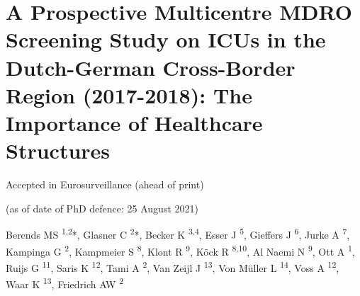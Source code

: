 \documentclass[
]{book}
\begin{document}
\hypertarget{ch10-multi-mdro-screening}{%
\chapter{A Prospective Multicentre MDRO Screening Study on ICUs in the Dutch-German Cross-Border Region (2017-2018): The Importance of Healthcare Structures}\label{ch10-multi-mdro-screening}}

Accepted in Eurosurveillance (ahead of print)

(as of date of PhD defence: 25 August 2021)

Berends MS \textsuperscript{1,2}*, Glasner C \textsuperscript{2}*, Becker K \textsuperscript{3,4}, Esser J \textsuperscript{5}, Gieffers J \textsuperscript{6}, Jurke A \textsuperscript{7}, Kampinga G \textsuperscript{2}, Kampmeier S \textsuperscript{8}, Klont R \textsuperscript{9}, Köck R \textsuperscript{8,10}, Al Naemi N \textsuperscript{9}, Ott A \textsuperscript{1}, Ruijs G \textsuperscript{11}, Saris K \textsuperscript{12}, Tami A \textsuperscript{2}, Van Zeijl J \textsuperscript{13}, Von Müller L \textsuperscript{14}, Voss A \textsuperscript{12}, Waar K \textsuperscript{13}, Friedrich AW \textsuperscript{2}
\end{document}
